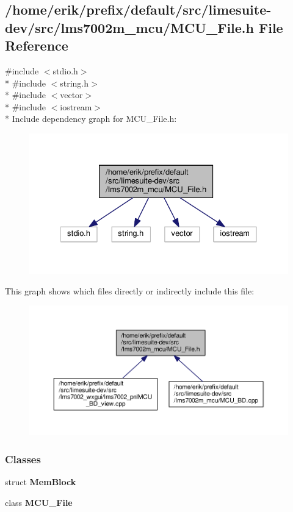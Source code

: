 \subsection{/home/erik/prefix/default/src/limesuite-\/dev/src/lms7002m\+\_\+mcu/\+M\+C\+U\+\_\+\+File.h File Reference}
\label{MCU__File_8h}
{\ttfamily \#include $<$stdio.\+h$>$}\\*
{\ttfamily \#include $<$string.\+h$>$}\\*
{\ttfamily \#include $<$vector$>$}\\*
{\ttfamily \#include $<$iostream$>$}\\*
Include dependency graph for M\+C\+U\+\_\+\+File.\+h\+:
\nopagebreak
\begin{figure}[H]
\begin{center}
\leavevmode
\includegraphics[width=328pt]{d9/df3/MCU__File_8h__incl}
\end{center}
\end{figure}
This graph shows which files directly or indirectly include this file\+:
\nopagebreak
\begin{figure}[H]
\begin{center}
\leavevmode
\includegraphics[width=350pt]{da/d91/MCU__File_8h__dep__incl}
\end{center}
\end{figure}
\subsubsection*{Classes}
\begin{DoxyCompactItemize}
\item 
struct {\bf Mem\+Block}
\item 
class {\bf M\+C\+U\+\_\+\+File}
\end{DoxyCompactItemize}
